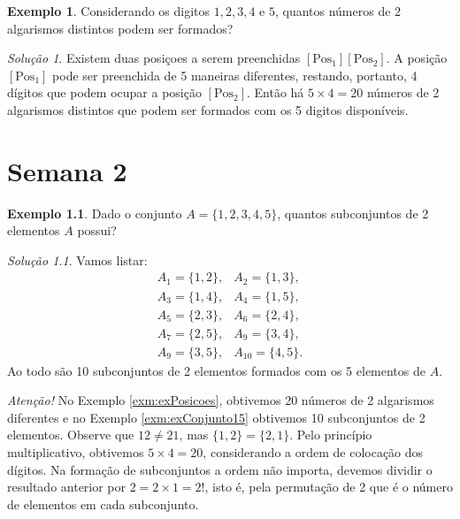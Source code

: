 \documentclass[]{book}
\theoremstyle{definition}
\theoremstyle{definition}
\newtheorem{example}{Exemplo}[chapter]
\theoremstyle{definition}
\theoremstyle{remark}
\newtheorem*{solution}{Solução}
\begin{document}
\begin{example}
\protect\hypertarget{exm:exPosicoes}{}{\label{exm:exPosicoes} }Considerando os digitos \(1, 2, 3, 4\) e \(5\), quantos números de 2 algarismos distintos podem ser formados?
\end{example}

\begin{solution}
\iffalse{} {Solução. } \fi{}Existem duas posiçoes a serem preenchidas \([\text{Pos}_1][\text{Pos}_2]\).
A posição \([\text{Pos}_1]\) pode ser preenchida de 5 maneiras diferentes, restando, portanto, 4 dígitos que podem ocupar a posição \([\text{Pos}_2]\).
Então há \(5\times 4 = 20\) números de 2 algarismos distintos que podem ser formados com os 5 digitos disponíveis.
\end{solution}

\hypertarget{sem2}{%
\chapter{Semana 2}\label{sem2}}

\begin{example}
\protect\hypertarget{exm:exConjunto15}{}{\label{exm:exConjunto15} }Dado o conjunto \(A = \{1,2,3,4,5\}\), quantos subconjuntos de 2 elementos \(A\) possui?
\end{example}

\begin{solution}
\iffalse{} {Solução. } \fi{}Vamos listar:
\[
  \left.\begin{matrix}
A_1 = \{1,2\}, & A_2 = \{1,3\},\\ 
A_3 = \{1,4\}, & A_4 = \{1,5\},\\ 
A_5 = \{2,3\}, & A_6 = \{2,4\},\\ 
A_7 = \{2,5\}, & A_9 = \{3,4\},\\ 
A_9 = \{3,5\}, & A_{10} = \{4,5\}. 
\end{matrix}\right.
\]
Ao todo são 10 subconjuntos de 2 elementos formados com os 5 elementos de \(A\).
\end{solution}

\emph{Atenção!} No Exemplo \ref{exm:exPosicoes}, obtivemos 20 números de 2 algarismos diferentes e no Exemplo \ref{exm:exConjunto15} obtivemos 10 subconjuntos de 2 elementos.
Observe que \(12 \neq 21\), mas \(\{1,2\}=\{2,1\}\).
Pelo princípio multiplicativo, obtivemos \(5\times 4=20\), considerando a ordem de colocação dos dígitos.
Na formação de subconjuntos a ordem não importa, devemos dividir o resultado anterior por \(2 = 2\times 1 = 2!\), isto é, pela permutação de 2 que é o número de elementos em cada subconjunto.
\end{document}
